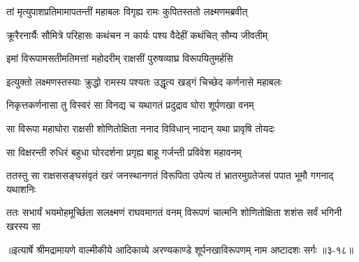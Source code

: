 \twolineshloka
{तां मृत्युपाशप्रतिमामापतन्तीं महाबलः}
{विगृह्य रामः कुपितस्ततो लक्ष्मणमब्रवीत्} %

\twolineshloka
{क्रूरैरनार्यैः सौमित्रे परिहासः कथंचन}
{न कार्यः पश्य वैदेहीं कथंचित् सौम्य जीवतीम्} %

\twolineshloka
{इमां विरूपामसतीमतिमत्तां महोदरीम्}
{राक्षसीं पुरुषव्याघ्र विरूपयितुमर्हसि} %

\twolineshloka
{इत्युक्तो लक्ष्मणस्तस्याः क्रुद्धो रामस्य पश्यतः}
{उद्धृत्य खड्गं चिच्छेद कर्णनासे महाबलः} %

\twolineshloka
{निकृत्तकर्णनासा तु विस्वरं सा विनद्य च}
{यथागतं प्रदुद्राव घोरा शूर्पणखा वनम्} %

\twolineshloka
{सा विरूपा महाघोरा राक्षसी शोणितोक्षिता}
{ननाद विविधान् नादान् यथा प्रावृषि तोयदः} %

\twolineshloka
{सा विक्षरन्ती रुधिरं बहुधा घोरदर्शना}
{प्रगृह्य बाहू गर्जन्ती प्रविवेश महावनम्} %

\twolineshloka
{ततस्तु सा राक्षससङ्घसंवृतं खरं जनस्थानगतं विरूपिता}
{उपेत्य तं भ्रातरमुग्रतेजसं पपात भूमौ गगनाद् यथाशनिः} %

\twolineshloka
{ततः सभार्यं भयमोहमूर्च्छिता सलक्ष्मणं राघवमागतं वनम्}
{विरूपणं चात्मनि शोणितोक्षिता शशंस सर्वं भगिनी खरस्य सा} %


॥इत्यार्षे श्रीमद्रामायणे वाल्मीकीये आदिकाव्ये अरण्यकाण्डे शूर्पनखाविरूपणम् नाम अष्टादशः सर्गः ॥३-१८॥
